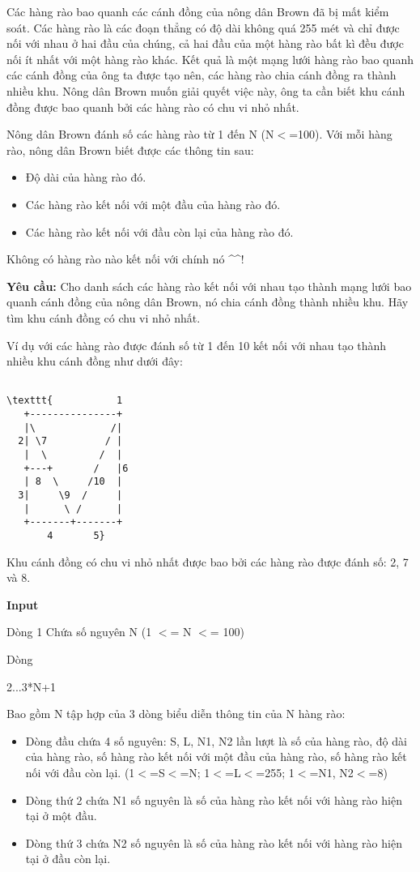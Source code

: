 

Các hàng rào bao quanh các cánh đồng của nông dân Brown đã bị mất kiểm soát. Các hàng rào là các đoạn thẳng có độ dài không quá 255 mét và chỉ được nối với nhau ở hai đầu của chúng, cả hai đầu của một hàng rào bất kì đều được nối ít nhất với một hàng rào khác. Kết quả là một mạng lưới hàng rào bao quanh các cánh đồng của ông ta được tạo nên, các hàng rào chia cánh đồng ra thành nhiều khu. Nông dân Brown muốn giải quyết việc này, ông ta cần biết khu cánh đồng được bao quanh bởi các hàng rào có chu vi nhỏ nhất.

Nông dân Brown đánh số các hàng rào từ 1 đến N (N$<$=100). Với mỗi hàng rào, nông dân Brown biết được các thông tin sau:
\begin{itemize}
	\item Độ dài của hàng rào đó.
	\item Các hàng rào kết nối với một đầu của hàng rào đó.
	\item Các hàng rào kết nối với đầu còn lại của hàng rào đó.
\end{itemize}

Không có hàng rào nào kết nối với chính nó \textasciicircum\textasciicircum!

\textbf{Yêu cầu: } Cho danh sách các hàng rào kết nối với nhau tạo thành mạng lưới bao quanh cánh đồng của nông dân Brown, nó chia cánh đồng thành nhiều khu. Hãy tìm khu cánh đồng có chu vi nhỏ nhất.

Ví dụ với các hàng rào được đánh số từ 1 đến 10 kết nối với nhau tạo thành nhiều khu cánh đồng như dưới đây:
\begin{verbatim}

\texttt{           1
   +---------------+
   |\             /|
  2| \7          / |
   |  \         /  |
   +---+       /   |6
   | 8  \     /10  |
  3|     \9  /     |
   |      \ /      |
   +-------+-------+
       4       5}\end{verbatim}

Khu cánh đồng có chu vi nhỏ nhất được bao bởi các hàng rào được đánh số: 2, 7 và 8.   

\textbf{Input }

Dòng 1 Chứa số nguyên N (1 $<$= N $<$= 100)

Dòng

2...3*N+1

Bao gồm N tập hợp của 3 dòng biểu diễn thông tin của N hàng rào:
\begin{itemize}
	\item Dòng đầu chứa 4 số nguyên: S, L, N1, N2 lần lượt là số của hàng rào, độ dài của hàng rào, số hàng rào kết nối với một đầu của hàng rào, số hàng rào kết nối với đầu còn lại. (1$<$=S$<$=N; 1$<$=L$<$=255; 1$<$=N1, N2$<$=8)
\end{itemize}
\begin{itemize}
	\item Dòng thứ 2 chứa N1 số nguyên là số của hàng rào kết nối với hàng rào hiện tại ở một đầu.
\end{itemize}
\begin{itemize}
	\item Dòng thứ 3 chứa N2 số nguyên là số của hàng rào kết nối với hàng rào hiện tại ở đầu còn lại.
\end{itemize}

